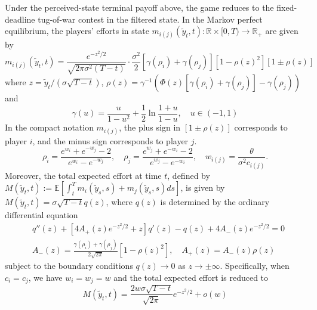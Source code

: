 \documentclass[mnsc]{informs3}
\begin{document}
\begin{theorem}
Under the perceived-state terminal payoff above, the game reduces to the fixed-deadline tug-of-war contest in the filtered state.
In the Markov perfect equilibrium, the players’ efforts in state $m_{i(j)}(\tilde{y}_t, t) :\mathbb{R}\times[0, T)\to\mathbb{R}_+$ are given by
\begin{equation}\label{eq-equilibrium-effort}
m_{i(j)}(\tilde{y}_t, t) = \frac{e^{-z^2/2}}{\sqrt{2\pi\sigma^2(T-t)}}\cdot \frac{\sigma^2}{2}\left[\gamma(\rho_{i}) + \gamma(\rho_{j})\right]\left[1-\rho(z)^2\right]\left[1 \pm \rho(z)\right]
\end{equation}
where $z = \tilde{y}_t / (\sigma\sqrt{T-t})$, $\rho(z) = \gamma^{-1}\left(\Phi(z)\left[\gamma(\rho_{i})+\gamma(\rho_{j})\right]-\gamma(\rho_{j})\right)$ and
\begin{equation}\label{eq-gamma}
\gamma(u) = \frac{u}{1-u^2} + \frac{1}{2}\ln\frac{1+u}{1-u},\quad u\in(-1,1)
\end{equation}
In the compact notation $m_{i(j)}$, the plus sign in $[1\pm\rho(z)]$ corresponds to player $i$, and the minus sign corresponds to player $j$.
\begin{equation*}
\rho_{i} = \frac{e^{w_{i}}+e^{-w_{j}}-2}{e^{w_{i}}-e^{-w_{j}}},
\quad
\rho_{j} = \frac{e^{w_{j}}+e^{-w_{i}}-2}{e^{w_{j}}-e^{-w_{i}}},
\quad
w_{i(j)} = \frac{\theta}{\sigma^2 c_{i(j)}}.
\end{equation*}
Moreover, the total expected effort at time $t$, defined by $M(\tilde{y}_t, t) := \mathbb{E}\left[\int^T_t m_i(\tilde{y}_s, s) + m_j(\tilde{y}_s, s)ds\right]$, is given by $M(\tilde{y}_t, t) = \sigma \sqrt{T-t} q(z)$, where $q(z)$ is determined by the ordinary differential equation
\begin{equation}
\begin{aligned}
&q''(z) + \left[4A_+(z)e^{-z^2/2}+z\right]q'(z) - q(z) + 4A_-(z)e^{-z^2/2} = 0\\
&A_-(z) = \frac{\gamma(\rho_i) + \gamma(\rho_j)}{2\sqrt{2\pi}}[1 - \rho(z)^2],
\quad A_+(z) = A_-(z)\rho(z)
\end{aligned}
\end{equation}
subject to the boundary conditions $q(z)\to0$ as $z\to\pm\infty$.
Specifically, when $c_i = c_j$, we have $w_i = w_j = w$ and the total expected effort is reduced to
\begin{equation}\label{eq-totaleffort-reduced}
M(\tilde{y}_t, t) = \frac{2w\sigma\sqrt{T-t}}{\sqrt{2\pi}}e^{-z^2/2} + o(w)
\end{equation}
\end{theorem}
\end{document}
